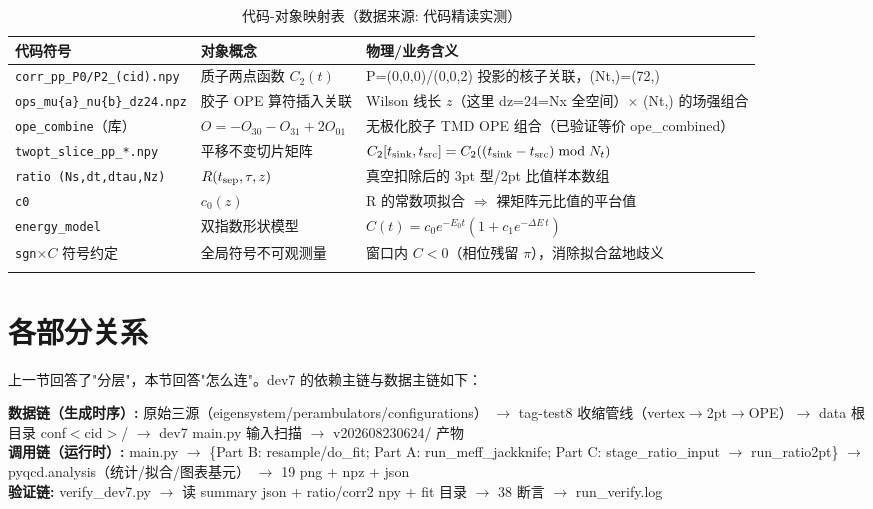 \documentclass[UTF8]{ctexart}
\begin{document}
\begin{xltabular}{\textwidth}{llX}
\toprule
代码符号 & 对象概念 & 物理/业务含义 \\
\midrule
\endhead
\texttt{corr\_pp\_P0/P2\_(cid).npy} & 质子两点函数 $C_2(t)$ & P=(0,0,0)/(0,0,2) 投影的核子关联，(Nt,)=(72,) \\
\texttt{ops\_mu\{a\}\_nu\{b\}\_dz24.npz} & 胶子 OPE 算符插入关联 & Wilson 线长 $z$（这里 dz=24=Nx 全空间）$\times$ (Nt,) 的场强组合 \\
\texttt{ope\_combine}（库） & $O=-O_{30}-O_{31}+2O_{01}$ & 无极化胶子 TMD OPE 组合（已验证等价 ope\_combined） \\
\texttt{twopt\_slice\_pp\_*.npy} & 平移不变切片矩阵 & $C_2[t_{\rm sink},t_{\rm src}]=C_2((t_{\rm sink}-t_{\rm src})\bmod N_t)$ \\
\texttt{ratio (Ns,dt,dtau,Nz)} & $R(t_{\rm sep},\tau,z)$ & 真空扣除后的 3pt 型/2pt 比值样本数组 \\
\texttt{c0} & $c_0(z)$ & R 的常数项拟合 $\Rightarrow$ 裸矩阵元比值的平台值 \\
\texttt{energy\_model} & 双指数形状模型 & $C(t)=c_0 e^{-E_0 t}(1+c_1 e^{-\Delta E\, t})$ \\
\texttt{sgn}$\times C$ 符号约定 & 全局符号不可观测量 & 窗口内 $C<0$（相位残留 $\pi$），消除拟合盆地歧义 \\
\bottomrule
\caption{代码-对象映射表（数据来源: 代码精读实测）}
\end{xltabular}

\section{各部分关系}
上一节回答了"分层"，本节回答"怎么连"。dev7 的依赖主链与数据主链如下：

\begin{keybox}
\textbf{数据链（生成时序）:} \textcolor{relation}{原始三源（eigensystem/perambulators/configurations）
$\to$ tag-test8 收缩管线（vertex$\to$2pt$\to$OPE）$\to$ data 根目录 conf$<$cid$>$/
$\to$ dev7 main.py 输入扫描 $\to$ v202608230624/ 产物} \\
\textbf{调用链（运行时）:} \textcolor{relation}{main.py
$\to$ \{Part B: resample/do\_fit; Part A: run\_meff\_jackknife; Part C: stage\_ratio\_input $\to$ run\_ratio2pt\}
$\to$ pyqcd.analysis（统计/拟合/图表基元） $\to$ 19 png + npz + json} \\
\textbf{验证链:} \textcolor{relation}{verify\_dev7.py $\to$ 读 summary json + ratio/corr2 npy + fit 目录 $\to$ 38 断言 $\to$ run\_verify.log}
\end{keybox}
\end{document}
